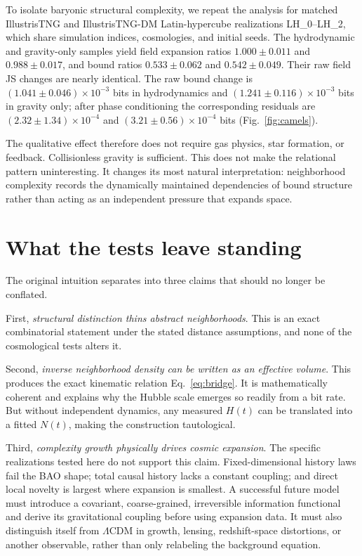 \documentclass[10pt,twocolumn]{article}
\newcommand{\LCDM}{$\Lambda$CDM}
\begin{document}
To isolate baryonic structural complexity, we repeat the analysis for matched
IllustrisTNG and IllustrisTNG-DM Latin-hypercube realizations LH\_0--LH\_2,
which share simulation indices, cosmologies, and initial seeds.  The
hydrodynamic and gravity-only samples yield field expansion ratios
$1.000\pm0.011$ and $0.988\pm0.017$, and bound ratios $0.533\pm0.062$ and
$0.542\pm0.049$.  Their raw field JS changes are nearly identical.  The raw
bound change is $(1.041\pm0.046)\times10^{-3}$ bits in hydrodynamics and
$(1.241\pm0.116)\times10^{-3}$ bits in gravity only; after phase conditioning
the corresponding residuals are $(2.32\pm1.34)\times10^{-4}$ and
$(3.21\pm0.56)\times10^{-4}$ bits (Fig.~\ref{fig:camels}).

The qualitative effect therefore does not require gas physics, star formation,
or feedback.  Collisionless gravity is sufficient.  This does not make the
relational pattern uninteresting.  It changes its most natural interpretation:
neighborhood complexity records the dynamically maintained dependencies of
bound structure rather than acting as an independent pressure that expands
space.

\section{What the tests leave standing}

The original intuition separates into three claims that should no longer be
conflated.

First, \emph{structural distinction thins abstract neighborhoods}.  This is an
exact combinatorial statement under the stated distance assumptions, and none
of the cosmological tests alters it.

Second, \emph{inverse neighborhood density can be written as an effective
volume}.  This produces the exact kinematic relation
Eq.~\eqref{eq:bridge}.  It is mathematically coherent and explains why the
Hubble scale emerges so readily from a bit rate.  But without independent
dynamics, any measured $H(t)$ can be translated into a fitted $N(t)$, making
the construction tautological.

Third, \emph{complexity growth physically drives cosmic expansion}.  The
specific realizations tested here do not support this claim.  Fixed-dimensional
history laws fail the BAO shape; total causal history lacks a constant
coupling; and direct local novelty is largest where expansion is smallest.  A
successful future model must introduce a covariant, coarse-grained,
irreversible information functional and derive its gravitational coupling
before using expansion data.  It must also distinguish itself from \LCDM{} in
growth, lensing, redshift-space distortions, or another observable, rather than
only relabeling the background equation.
\end{document}
